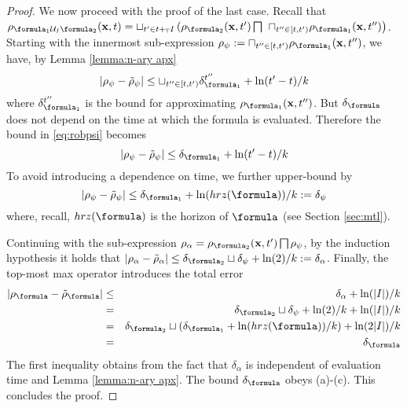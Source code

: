 \begin{proof}
We now proceed with the proof of the last case.
Recall that $\rob_{ \formula_1 \until_I \formula_2} (\sstraj,t) = \sqcup_{t' \in t+_{\TDom}I} \left(\rob_{\formula_2} (\sstraj,t') \bigsqcap \right.
\\
\left. \sqcap_{t'' \in [t,t')}   \rob_{\formula_1} (\sstraj,t'') \right)$.
Starting with the innermost sub-expression $\rob_\psi \defeq \sqcap_{t'' \in [t,t')}   \rob_{\formula_1} (\sstraj,t'')$, we have, by Lemma \ref{lemma:n-ary apx}
\begin{equation}
\label{eq:robpsi}
|\rob_{\psi}-\srob_\psi| \leq \sqcup_{t'' \in [t,t')}\delta_{\formula_1}^{t''} + \ln(t'-t)/k
\end{equation} 
where $\delta_{\formula_1}^{t''} $ is the bound for approximating $\rob_{\formula_1}(\sstraj,t'')$.
But $\delta_\formula$ does not depend on the time at which the formula is evaluated. 
Therefore the bound in \eqref{eq:robpsi} becomes
\begin{equation}
\label{eq:t'-t}
|\rob_{\psi}-\srob_\psi| \leq \delta_{\formula_1} + \ln(t'-t)/k
\end{equation} 
%
To avoid introducing a dependence on time, we further upper-bound by 
\begin{equation*}
|\rob_{\psi}-\srob_\psi| \leq \delta_{\formula_1} + \ln(hrz(\formula))/k \defeq \delta_\psi
\end{equation*} 
where, recall, $hrz(\formula)$ is the horizon of $\formula$ (see Section \ref{sec:mtl}).

Continuing with the sub-expression $\rob_\alpha = \rob_{\formula_2} (\sstraj,t') \bigsqcap \rob_\psi$, by the induction hypothesis it holds that 
$|\rob_\alpha - \srob_\alpha| \leq \delta_{\formula_2} \sqcup \delta_\psi + \ln(2)/k \defeq \delta_\alpha$.
%
Finally, the top-most max operator introduces the total error 
\begin{eqnarray}
\label{eq:deltaphi until}
|\robf-\srobf| &\leq& \delta_\alpha + \ln(|I|)/k 
\nonumber
\\
&=& \delta_{\formula_2} \sqcup \delta_\psi + \ln(2)/k + \ln(|I|)/k 
\nonumber 
\\
&=& \delta_{\formula_2} \sqcup ( \delta_{\formula_1} + \ln(hrz(\formula))/k )+ \ln(2|I|)/k 
\nonumber
\\
&=&\delta_\formula
\end{eqnarray}
The first inequality obtains from the fact that $\delta_\alpha$ is independent of evaluation time and Lemma \ref{lemma:n-ary apx}.
The bound $\delta_\formula$ obeys (a)-(c).
This concludes the proof.
	\end{proof}
	
